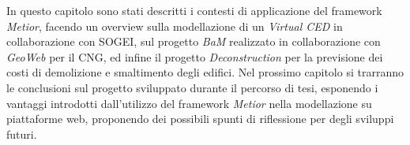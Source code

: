 In questo capitolo sono stati descritti i contesti di applicazione del framework
\emph{Metior}, facendo un overview sulla modellazione di un \emph{Virtual CED} in collaborazione con
SOGEI, sul progetto \emph{BaM} realizzato in collaborazione con \emph{GeoWeb} per il CNG,
ed infine il progetto \emph{Deconstruction} per la previsione dei costi di demolizione e smaltimento degli edifici.
Nel prossimo capitolo si trarranno le conclusioni sul progetto sviluppato durante il
percorso di tesi, esponendo i vantaggi introdotti dall’utilizzo del framework
\emph{Metior} nella modellazione su piattaforme web, proponendo dei possibili
spunti di riflessione per degli sviluppi futuri.
